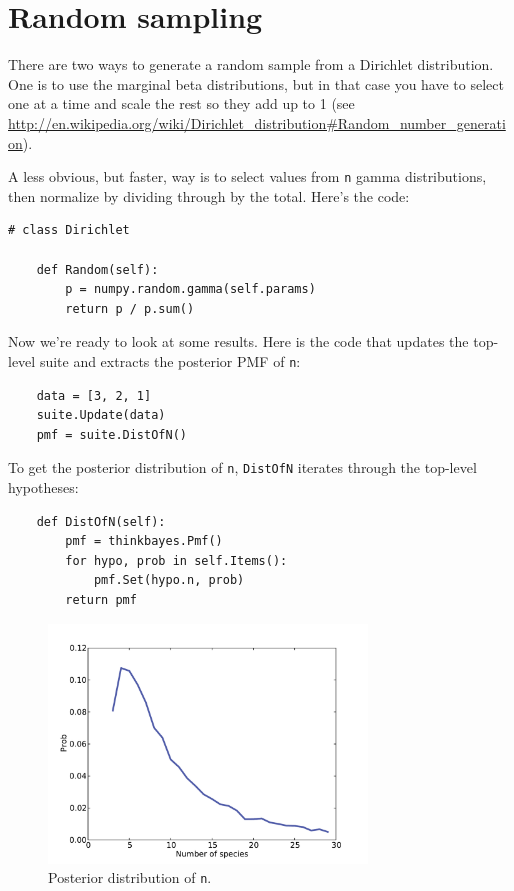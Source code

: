 \documentclass[12pt]{book}
\begin{document}
\section{Random sampling}

There are two ways to generate a random sample from a Dirichlet
distribution.  One is to use the marginal beta distributions, but in
that case you have to select one at a time and scale the rest so they
add up to 1 (see
\url{http://en.wikipedia.org/wiki/Dirichlet_distribution#Random_number_generation}).

A less obvious, but faster, way is to select values from {\tt n} gamma
distributions, then normalize by dividing through by the total. 
Here's the code:

\begin{verbatim}
# class Dirichlet

    def Random(self):
        p = numpy.random.gamma(self.params)
        return p / p.sum()
\end{verbatim}

Now we're ready to look at some results.  Here is the code that
updates the top-level suite and extracts the posterior PMF of {\tt n}:

\begin{verbatim}
    data = [3, 2, 1]
    suite.Update(data)
    pmf = suite.DistOfN()
\end{verbatim}

To get the posterior distribution of {\tt n}, {\tt DistOfN} iterates
through the top-level hypotheses:

\begin{verbatim}
    def DistOfN(self):
        pmf = thinkbayes.Pmf()
        for hypo, prob in self.Items():
            pmf.Set(hypo.n, prob)
        return pmf
\end{verbatim}

\begin{figure}
\centerline{\includegraphics[height=2.5in]{figs/species2.pdf}}
\caption{Posterior distribution of {\tt n}.}
\label{fig.species2}
\end{figure}
\end{document}
